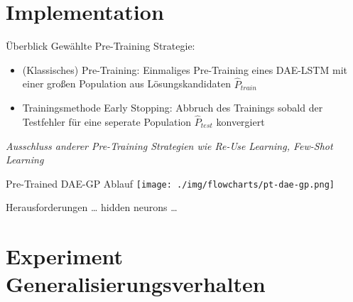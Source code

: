 \documentclass[
  ignorenonframetext,
]{beamer}
\begin{document}
\hypertarget{implementation}{%
\section{Implementation}\label{implementation}}

\begin{frame}{Überblick}
\protect\hypertarget{uxfcberblick}{}
Gewählte Pre-Training Strategie:

\begin{itemize}
\item
  (Klassisches) Pre-Training: Einmaliges Pre-Training eines DAE-LSTM mit
  einer großen Population aus Lösungskandidaten \(\hat{P}_{train}\)
\item
  Trainingsmethode Early Stopping: Abbruch des Trainings sobald der
  Testfehler für eine seperate Population \(\hat{P}_{test}\) konvergiert
\end{itemize}

\emph{Ausschluss anderer Pre-Training Strategien wie Re-Use Learning,
Few-Shot Learning}
\end{frame}

\begin{frame}{Pre-Trained DAE-GP Ablauf}
\protect\hypertarget{pre-trained-dae-gp-ablauf}{}
\texttt{[image: ./img/flowcharts/pt-dae-gp.png]}
\end{frame}

\begin{frame}{Herausforderungen}
\protect\hypertarget{herausforderungen}{}
\ldots{} hidden neurons \ldots{}
\end{frame}

\hypertarget{experiment-generalisierungsverhalten}{%
\section{Experiment
Generalisierungsverhalten}\label{experiment-generalisierungsverhalten}}
\end{document}
